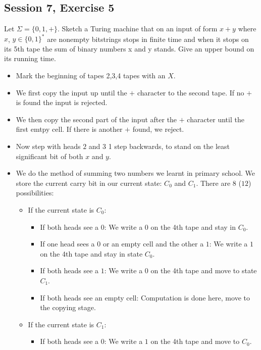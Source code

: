 \subsection {Session 7, Exercise 5}


Let $\Sigma = \{0, 1, +\}$. Sketch a Turing machine that on an input of form $x + y$ where $x$, $y \in \{0, 1\}^*$ are nonempty bitstrings stops in finite time and when it stops on its 5th tape the sum of binary numbers x and y stands. Give an upper bound on its running time.


\begin{itemize}
    \item Mark the beginning of tapes 2,3,4 tapes with an $X$.
    \item We first copy the input up until the $+$ character to the second tape. If no $+$ is found the input is rejected.
    \item We then copy the second part of the input after the $+$ character until the first emtpy cell. If there is another $+$ found, we reject.
    \item Now step with heads $2$ and $3$ 1 step backwards, to stand on the least significant bit of both $x$ and $y$.
    \item We do the method of summing two numbers we learnt in primary school. We store the current carry bit in our current state: $C_0$ and $C_1$. There are $8$ ($12$) possibilities:
    \begin{itemize}
        \item If the current state is $C_0$:
        \begin{itemize}
            \item If both heads see a $0$: We write a $0$ on the 4th tape and stay in $C_0$.
            \item If one head sees a $0$ or an empty cell and the other a $1$: We write a $1$ on the 4th tape and stay in state $C_0$.
            \item If both heads see a $1$: We write a $0$ on the 4th tape and move to state $C_1$.
            \item If both heads see an empty cell: Computation is done here, move to the copying stage.
        \end{itemize}
        \item If the current state is $C_1$:
        \begin{itemize}
            \item If both heads see a $0$: We write a $1$ on the 4th tape and move to $C_0$.

\end{itemize}
\end{itemize}
\end{itemize}
